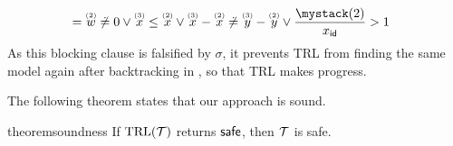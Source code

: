 \begin{example}
{\begin{align*}
    {} = {} & \ind{w}{2} \not\doteq 0 \lor \ind{x}{3} \leq \ind{x}{2} \lor \ind{x}{3} - \ind{x}{2} \not\doteq \ind{y}{3} - \ind{y}{2} \lor \ind[\id]{x}{2} >1
  \end{align*}}
  As this blocking clause is falsified by $\sigma$, it prevents TRL from finding the same model again after backtracking in , so that TRL makes progress.
\end{example}
%
The following theorem states that our approach is sound.
%
%
\begin{restatable}
  {theorem}{soundness}
  \label{thm:soundness}
  If $\text{TRL}(\mathcal{T})$ returns $\mathsf{safe}$, then $\mathcal{T}$ is safe.
\end{restatable}
